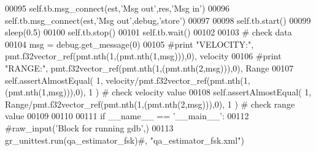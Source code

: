 \begin{DoxyCode}
00095         self.tb.msg\_connect(est,\textcolor{stringliteral}{'Msg out'},res,\textcolor{stringliteral}{'Msg in'})
00096         self.tb.msg\_connect(est,\textcolor{stringliteral}{'Msg out'},debug,\textcolor{stringliteral}{'store'})
00097 
00098         self.tb.start()
00099         sleep(0.5)
00100         self.tb.stop()
00101         self.tb.wait()
00102         
00103         \textcolor{comment}{# check data}
00104         msg = debug.get\_message(0)
00105         \textcolor{comment}{#print "VELOCITY:", pmt.f32vector\_ref(pmt.nth(1,(pmt.nth(1,msg))),0), velocity}
00106         \textcolor{comment}{#print "RANGE:", pmt.f32vector\_ref(pmt.nth(1,(pmt.nth(2,msg))),0), Range}
00107         self.assertAlmostEqual( 1, velocity/pmt.f32vector\_ref(pmt.nth(1,(pmt.nth(1,msg))),0), 1 ) \textcolor{comment}{# check
       velocity value}
00108         self.assertAlmostEqual( 1, Range/pmt.f32vector\_ref(pmt.nth(1,(pmt.nth(2,msg))),0), 1 ) \textcolor{comment}{# check
       range value}
00109 
00110 
00111 \textcolor{keywordflow}{if} \_\_name\_\_ == \textcolor{stringliteral}{'\_\_main\_\_'}:
00112     \textcolor{comment}{#raw\_input('Block for running gdb',)}
00113     gr\_unittest.run(qa\_estimator\_fsk)\textcolor{comment}{#, "qa\_estimator\_fsk.xml")}
\end{DoxyCode}
